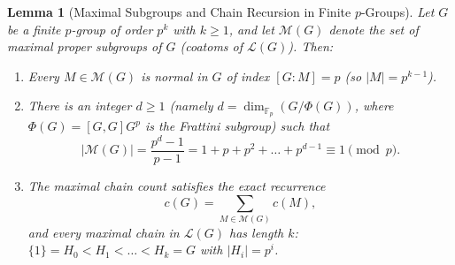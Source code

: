 \documentclass[11pt,a4paper]{article}
\newtheorem{lemma}[theorem]{Lemma}
\theoremstyle{definition}
\newcommand{\Fp}{\mathbb{F}_p}
\begin{document}
\begin{lemma}[Maximal Subgroups and Chain Recursion in Finite $p$-Groups]\label{lem:max-sub}
Let $G$ be a finite $p$-group of order $p^k$ with $k \ge 1$, and let $\mathcal{M}(G)$ denote the set of maximal proper subgroups of $G$ (coatoms of $\mathcal{L}(G)$). Then:
\begin{enumerate}
  \item Every $M \in \mathcal{M}(G)$ is normal in $G$ of index $[G : M] = p$ (so $|M| = p^{k-1}$).
  \item There is an integer $d \ge 1$ (namely $d = \dim_{\Fp}(G/\Phi(G))$, where $\Phi(G) = [G,G]G^p$ is the Frattini subgroup) such that
  \[
    |\mathcal{M}(G)| = \frac{p^d - 1}{p - 1} = 1 + p + p^2 + \dots + p^{d-1} \equiv 1 \pmod p.
  \]
  \item The maximal chain count satisfies the exact recurrence
  \begin{equation}\label{eq:chain-rec}
    c(G) = \sum_{M \in \mathcal{M}(G)} c(M),
  \end{equation}
  and every maximal chain in $\mathcal{L}(G)$ has length $k$: $\{1\} = H_0 < H_1 < \dots < H_k = G$ with $|H_i| = p^i$.
\end{enumerate}
\end{lemma}
\end{document}
